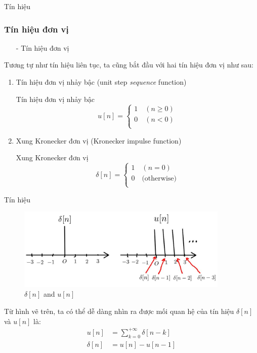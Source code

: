 \documentclass[8pt]{beamer}
\begin{document}
\begin{frame}{Tín hiệu}
\subsubsection{Tín hiệu đơn vị}
\begin{itemize}
	\item[-] Tín hiệu đơn vị
\end{itemize}
Tương tự như tín hiệu liên tục, ta cũng bắt đầu với hai tín hiệu đơn vị như sau:
\begin{enumerate}
	\item Tín hiệu đơn vị nhảy bậc (unit step \textit{sequence} function)
\begin{block}{Tín hiệu đơn vị nhảy bậc}
\begin{equation*}
u[n]=
\begin{cases}
1 \quad(n\geq0)\\
0 \quad(n<0) \\
\end{cases}
\end{equation*}
\end{block}
	\item Xung Kronecker đơn vị (Kronecker impulse function)
		\begin{block}{Xung Kronecker đơn vị}
\begin{equation*}
\delta[n]=
\begin{cases}
1 \quad(n=0)\\
0 \quad(\text{otherwise)}\\
\end{cases}
\end{equation*}
\end{block}
\end{enumerate}
\end{frame}
\begin{frame}{Tín hiệu}
\begin{figure}[h]
			\includegraphics[width=0.9\textwidth]{kronecker.jpg}
			\caption{$\delta[n]$ and $u[n]$}	\label{fig:re14}
		\end{figure}

Từ hình vẽ trên, ta có thể dễ dàng nhìn ra được mối quan hệ của tín hiệu $\delta[n]$ và $u[n]$ là:
\begin{equation*}
\begin{split}
	u[n]&=\sum_{k=0}^{+\infty}\delta[n-k]\\
	\delta[n]&=u[n]-u[n-1]\\
\end{split}
\end{equation*}
\end{frame}
\end{document}
